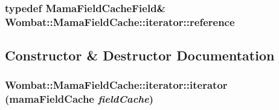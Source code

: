 \label{classWombat_1_1MamaFieldCache_1_1iterator_ac974845fb0c4d7a2275fdd32c1c643c6}
\hypertarget{classWombat_1_1MamaFieldCache_1_1iterator_a61360a7be022b1d37777fc56614cca55}{
\subsubsection[{reference}]{\setlength{\rightskip}{0pt plus 5cm}typedef {\bf MamaFieldCacheField}\& {\bf Wombat::MamaFieldCache::iterator::reference}}}
\label{classWombat_1_1MamaFieldCache_1_1iterator_a61360a7be022b1d37777fc56614cca55}


\subsection{Constructor \& Destructor Documentation}
\hypertarget{classWombat_1_1MamaFieldCache_1_1iterator_aa01dd3228d3a115135f8804bd027598a}{
\subsubsection[{iterator}]{\setlength{\rightskip}{0pt plus 5cm}Wombat::MamaFieldCache::iterator::iterator (mamaFieldCache {\em fieldCache})}}
\label{classWombat_1_1MamaFieldCache_1_1iterator_aa01dd3228d3a115135f8804bd027598a}


